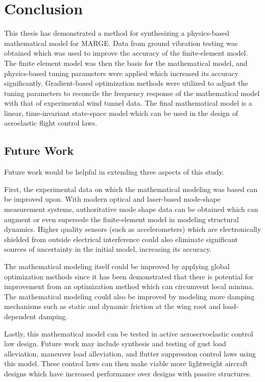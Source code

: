 \chapter{Conclusion}
\label{ch:conclusion}

This thesis has demonstrated a method for synthesizing a physics-based mathematical model for MARGE. Data from ground vibration testing was obtained which was used to improve the accuracy of the finite-element model. The finite element model was then the basis for the mathematical model, and physics-based tuning parameters were applied which increased its accuracy significantly. Gradient-based optimization methods were utilized to adjust the tuning parameters to reconcile the frequency response of the mathematical model with that of experimental wind tunnel data. The final mathematical model is a linear, time-invariant state-space model which can be used in the design of aeroelastic flight control laws.

\section{Future Work}

Future work would be helpful in extending three aspects of this study.

First, the experimental data on which the mathematical modeling was based can be improved upon. With modern optical and laser-based mode-shape measurement systems, authoritative mode shape data can be obtained which can augment or even supersede the finite-element model in modeling structural dynamics. Higher quality sensors (such as accelerometers) which are electronically shielded from outside electrical interference could also eliminate significant sources of uncertainty in the initial model, increasing its accuracy.

The mathematical modeling itself could be improved by applying global optimization methods since it has been demonstrated that there is potential for improvement from an optimization method which can circumvent local minima. The mathematical modeling could also be improved by modeling more damping mechanisms such as static and dynamic friction at the wing root and load-dependent damping.

Lastly, this mathematical model can be tested in active aeroservoelastic control law design. Future work may include synthesis and testing of gust load alleviation, maneuver load alleviation, and flutter suppression control laws using this model. These control laws can then make viable more lightweight aircraft designs which have increased performance over designs with passive structures.